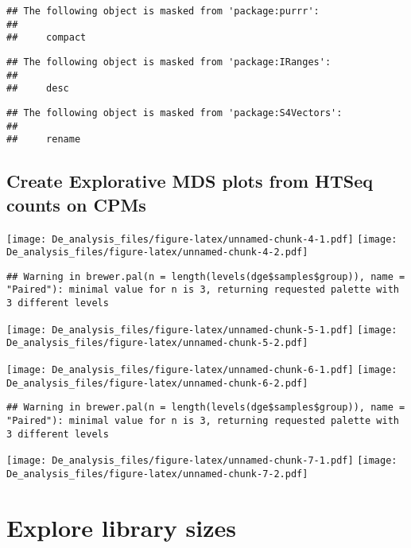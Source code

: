 \documentclass[]{article}
\begin{document}
\begin{verbatim}
## The following object is masked from 'package:purrr':
## 
##     compact
\end{verbatim}

\begin{verbatim}
## The following object is masked from 'package:IRanges':
## 
##     desc
\end{verbatim}

\begin{verbatim}
## The following object is masked from 'package:S4Vectors':
## 
##     rename
\end{verbatim}

\hypertarget{create-explorative-mds-plots-from-htseq-counts-on-cpms}{%
\subsection{Create Explorative MDS plots from HTSeq counts on
CPMs}\label{create-explorative-mds-plots-from-htseq-counts-on-cpms}}

\texttt{[image: De\_analysis\_files/figure-latex/unnamed-chunk-4-1.pdf]}
\texttt{[image: De\_analysis\_files/figure-latex/unnamed-chunk-4-2.pdf]}

\begin{verbatim}
## Warning in brewer.pal(n = length(levels(dge$samples$group)), name = "Paired"): minimal value for n is 3, returning requested palette with 3 different levels
\end{verbatim}

\texttt{[image: De\_analysis\_files/figure-latex/unnamed-chunk-5-1.pdf]}
\texttt{[image: De\_analysis\_files/figure-latex/unnamed-chunk-5-2.pdf]}

\texttt{[image: De\_analysis\_files/figure-latex/unnamed-chunk-6-1.pdf]}
\texttt{[image: De\_analysis\_files/figure-latex/unnamed-chunk-6-2.pdf]}

\begin{verbatim}
## Warning in brewer.pal(n = length(levels(dge$samples$group)), name = "Paired"): minimal value for n is 3, returning requested palette with 3 different levels
\end{verbatim}

\texttt{[image: De\_analysis\_files/figure-latex/unnamed-chunk-7-1.pdf]}
\texttt{[image: De\_analysis\_files/figure-latex/unnamed-chunk-7-2.pdf]}

\hypertarget{explore-library-sizes}{%
\section{Explore library sizes}\label{explore-library-sizes}}
\end{document}

